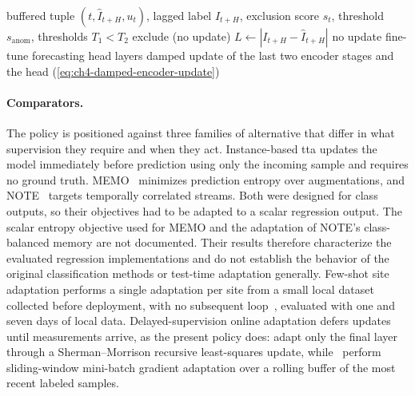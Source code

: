 \begin{algorithm}[!t]
\caption{Conditional on-device adaptation under lagged labels. The exclusion branch is evaluated in series with the policy in \cref{sec:ch4-admissibility-evaluation} and is inactive in the campaign of \cref{tab:ch4-solar-benchmark}.}
\label{alg:ch4-conditional-adaptation}
\begin{algorithmic}[1]
\Require buffered tuple $(t, \hat I_{t+H}, u_t)$, lagged label $I_{t+H}$, exclusion score $s_t$, threshold $s_{\mathrm{anom}}$, thresholds $T_1<T_2$
  \State exclude (no update)
\Else
  \State $L \gets \left|I_{t+H} - \hat I_{t+H}\right|$
    \State no update
    \State fine-tune forecasting head layers
  \Else
    \State damped update of the last two encoder stages and the head (\cref{eq:ch4-damped-encoder-update})
  \EndIf
\EndIf
\end{algorithmic}
\end{algorithm}

\paragraph{Comparators.} The policy is positioned against three families of alternative that differ in what supervision they require and when they act. Instance-based \gls{tta} updates the model immediately before prediction using only the incoming sample and requires no ground truth. MEMO~\cite{NEURIPS2022memo} minimizes prediction entropy over augmentations, and NOTE~\cite{gong2022note} targets temporally correlated streams. Both were designed for class outputs, so their objectives had to be adapted to a scalar regression output. The scalar entropy objective used for MEMO and the adaptation of NOTE's class-balanced memory are not documented. Their results therefore characterize the evaluated regression implementations and do not establish the behavior of the original classification methods or test-time adaptation generally. Few-shot site adaptation performs a single adaptation per site from a small local dataset collected before deployment, with no subsequent loop~\cite{PALETTA2024118398}, evaluated with one and seven days of local data. Delayed-supervision online adaptation defers updates until measurements arrive, as the present policy does: \citet{8397688} adapt only the final layer through a Sherman--Morrison recursive least-squares update, while~\citet{LARABENITEZ2023126312} perform sliding-window mini-batch gradient adaptation over a rolling buffer of the most recent labeled samples.

